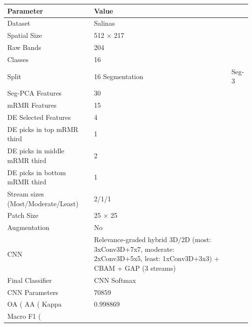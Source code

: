 \begin{tabular}{ll}
\toprule
Parameter & Value \\
\midrule
Dataset & Salinas \\
Spatial Size & 512 × 217 \\
Raw Bands & 204 \\
Classes & 16 \\
Split & 16%
Segmentation & Seg-3 \\
Seg-PCA Features & 30 \\
mRMR Features & 15 \\
DE Selected Features & 4 \\
DE picks in top mRMR third & 1 \\
DE picks in middle mRMR third & 2 \\
DE picks in bottom mRMR third & 1 \\
Stream sizes (Most/Moderate/Least) & 2/1/1 \\
Patch Size & 25 × 25 \\
Augmentation & No \\
CNN & Relevance-graded hybrid 3D/2D (most: 3xConv3D+7x7, moderate: 2xConv3D+5x5, least: 1xConv3D+3x3) + CBAM + GAP (3 streams) \\
Final Classifier & CNN Softmax \\
CNN Parameters & 70859 \\
OA (%
AA (%
Kappa & 0.998869 \\
Macro F1 (%
\bottomrule
\end{tabular}
